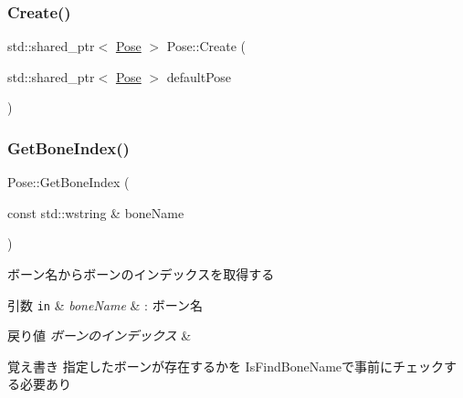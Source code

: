 \mbox{\label{class_pose_a44d938544c9613f1753007fa2e419bdd}} 
\subsubsection{\texorpdfstring{Create()}{Create()}\hspace{0.1cm}{\footnotesize\ttfamily [2/2]}}
{\footnotesize\ttfamily std\+::shared\+\_\+ptr$<$ \mbox{\hyperlink{class_pose}{Pose}} $>$ Pose\+::\+Create (\begin{DoxyParamCaption}\item[{std\+::shared\+\_\+ptr$<$ \mbox{\hyperlink{class_pose}{Pose}} $>$}]{default\+Pose }\end{DoxyParamCaption})\hspace{0.3cm}{\ttfamily [static]}}

\mbox{\label{class_pose_a068da60cad6259e02fdc047a454b0cde}} 
\subsubsection{\texorpdfstring{Get\+Bone\+Index()}{GetBoneIndex()}}
{\footnotesize\ttfamily Pose\+::\+Get\+Bone\+Index (\begin{DoxyParamCaption}\item[{const std\+::wstring \&}]{bone\+Name }\end{DoxyParamCaption})}

ボーン名からボーンのインデックスを取得する 
\begin{DoxyParams}[1]{引数}
\mbox{\tt in}  & {\em bone\+Name} & \+: ボーン名 \\
\hline
\end{DoxyParams}

\begin{DoxyRetVals}{戻り値}
{\em ボーンのインデックス} & \\
\hline
\end{DoxyRetVals}
\begin{DoxyNote}{覚え書き}
指定したボーンが存在するかを Is\+Find\+Bone\+Nameで事前にチェックする必要あり 
\end{DoxyNote}
\mbox{\label{class_pose_a3767b292c049a75e996431649e246cc2}} 

